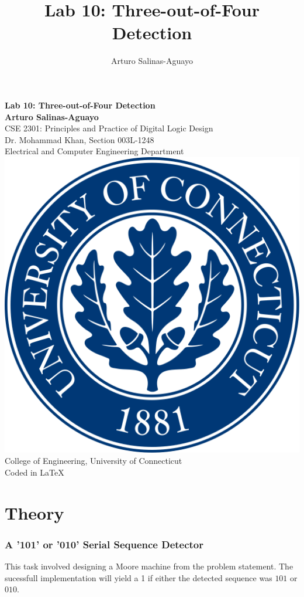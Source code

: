 \documentclass[12pt]{article}
\author{Arturo Salinas-Aguayo}
\title{Lab 10: Three-out-of-Four Detection}
\begin{document}
\newcommand{\closure}[2][3]{%
	{}\mkern#1mu\overline{\mkern-#1mu#2}}
\newcommand\ncoverline[1]{\mkern1mu\overline{\mkern-1mu#1\mkern-1mu}\mkern1mu}
\begin{titlepage}
	\centering
	\vspace*{3cm}
	\huge\textbf{Lab 10: Three-out-of-Four Detection}\\
	\vspace{5cm}
	\Large\textbf{Arturo Salinas-Aguayo}\\
	\normalsize
	CSE 2301: Principles and Practice of Digital Logic Design\\
	Dr. Mohammad Khan, Section 003L-1248\\
	Electrical and Computer Engineering Department
	\vfill
	\includegraphics[scale=0.1]{uconnlogo}\\
	College of Engineering, University of Connecticut\\
	\scriptsize{Coded in \LaTeX}
	\vspace*{1cm}
\end{titlepage}
\section*{Theory}
\subsubsection*{A '101' or '010' Serial Sequence Detector}
This task involved designing a Moore machine from the problem statement. The
sucessfull implementation will yield a 1 if either the detected sequence was
\(101\) or \(010\).
\end{document}
